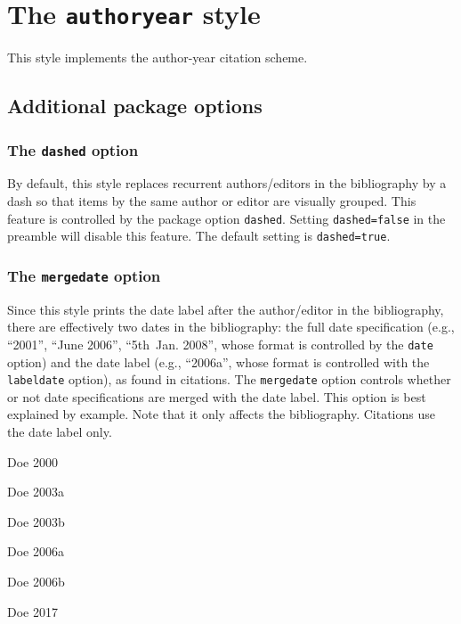 \documentclass[a4paper]{article}
\newenvironment{bibsample}
  {\trivlist\samepage
   \setlength{\itemsep}{0pt}}
  {\endtrivlist}
\begin{document}
\section*{The \texttt{authoryear} style}

This style implements the author-year citation scheme.

\subsection*{Additional package options}

\subsubsection*{The \texttt{dashed} option}

By default, this style replaces recurrent authors/editors in the
bibliography by a dash so that items by the same author or editor
are visually grouped. This feature is controlled by the package
option \texttt{dashed}. Setting \texttt{dashed=false} in the
preamble will disable this feature. The default setting is
\texttt{dashed=true}.

\subsubsection*{The \texttt{mergedate} option}

Since this style prints the date label after the author/editor in the
bibliography, there are effectively two dates in the bibliography:
the full date specification (e.g., \enquote{2001}, \enquote{June
2006}, \enquote{5th~Jan. 2008}, whose format is controlled by the
\texttt{date} option) and the date label (e.g., \enquote{2006a},
whose format is controlled with the \texttt{labeldate} option),
as found in citations. The \texttt{mergedate} option controls whether
or not date specifications are merged with the date label.
This option is best explained by example. Note that
it only affects the bibliography. Citations use the date label only.

\begin{bibsample}
\item Doe 2000
\item Doe 2003a
\item Doe 2003b
\item Doe 2006a
\item Doe 2006b
\item Doe 2017
\end{bibsample}
\end{document}

